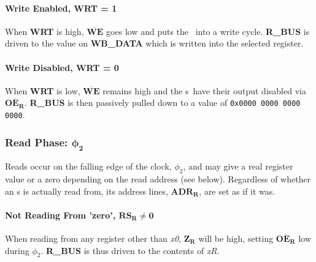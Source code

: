 \documentclass[a4paper, 11pt]{article}
\begin{document}
                \paragraph{Write Enabled, \textbf{WRT} = 1}
                    \label{par:Regs:TheoryOp:Write:Wrt}

                    When \textbf{WRT} is high, \(\mathbf{\overline{WE}}\) goes
                    low and puts the \ramshort\ into a write cycle. 
                    \textbf{R\_BUS} is driven to the value on \textbf{WB\_DATA} 
                    which is written into the selected register.

                \paragraph{Write Disabled, \textbf{WRT} = 0}
                    \label{par:Regs:TheoryOp:Write:NoWrt}

                    When \textbf{WRT} is low, \(\mathbf{\overline{WE}}\) remains
                    high and the \ramshort s\ have their output disabled via
                    \(\mathbf{\overline{OE_{R}}}\).
                    \textbf{R\_BUS} is then passively pulled down to a value of
                    \verb|0x0000 0000 0000 0000|.

            \subsubsection{Read Phase: \(\mathbf{\phi_{2}}\)}
                \label{sec:Regs:TheoryOp:Read}

                Reads occur on the falling edge of the clock, \(\phi_{2}\), and
                may give a real register value or a zero depending on the read
                address (see below).
                Regardless of whether an \ramshort s is actually read from, its 
                address lines, \(\mathbf{ADR_{R}}\), are set as if it was.
                
                \paragraph{Not Reading From 'zero', \(\mathbf{RS_{R} \ne 0}\)}
                    \label{par:Regs:TheoryOp:Read:NotZero}
                    
                    When reading from any register other than \emph{x0}, 
                    \(\mathbf{Z_{R}}\) will be high, setting
                    \(\mathbf{\overline{OE_{R}}}\) low during \(\phi_{2}\).
                    \textbf{R\_BUS} is thus driven to the contents of \emph{xR}.
\end{document}
